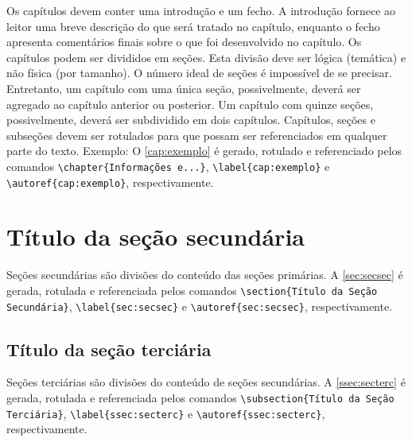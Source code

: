 Os capítulos devem conter uma introdução e um fecho. A introdução fornece ao leitor uma breve descrição do que será tratado no capítulo, enquanto o fecho apresenta comentários finais sobre o que foi desenvolvido no capítulo. Os capítulos podem ser divididos em seções\label{errata:secao}. Esta divisão deve ser lógica (temática) e não física (por tamanho). O número ideal de seções é impossível de se precisar. Entretanto, um capítulo com uma única seção, possivelmente, deverá ser agregado ao capítulo anterior ou posterior. Um capítulo com quinze seções, possivelmente, deverá ser subdividido em dois capítulos. Capítulos, seções e subseções\label{errata:subsecao} devem ser rotulados para que possam ser referenciados em qualquer parte do texto. Exemplo: O \autoref{cap:exemplo} é gerado, rotulado e referenciado pelos comandos \verb|\chapter{Informações e...}|, \verb|\label{cap:exemplo}| e \verb|\autoref{cap:exemplo}|, respectivamente.

\section{Título da seção secundária}\label{sec:secsec}

Seções secundárias são divisões do conteúdo das seções primárias. A \autoref{sec:secsec} é gerada, rotulada e referenciada pelos comandos \verb|\section{Título da Seção Secundária}|, \verb|\label{sec:secsec}| e \verb|\autoref{sec:secsec}|, respectivamente.

\subsection{Título da seção terciária}\label{ssec:secterc}

Seções terciárias são divisões do conteúdo de seções secundárias. A \autoref{ssec:secterc} é gerada, rotulada e referenciada pelos comandos \verb|\subsection{Título da Seção Terciária}|, \verb|\label{ssec:secterc}| e \verb|\autoref{ssec:secterc}|, respectivamente.

